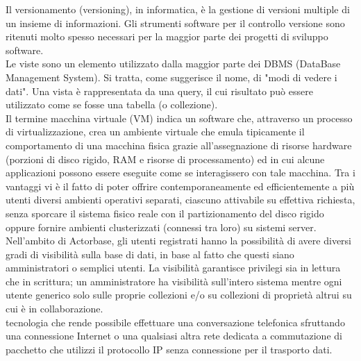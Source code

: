 \documentclass{scalatekids-article}
\begin{document}

   Il versionamento (versioning), in informatica, è la gestione di versioni multiple di un insieme di informazioni.
  Gli strumenti software per il controllo versione sono ritenuti molto spesso necessari per la maggior parte dei progetti di sviluppo software.
  \\
  
   Le viste sono un elemento utilizzato dalla maggior parte dei DBMS (DataBase Management System). Si tratta, come suggerisce il nome, di "modi di vedere i dati".
Una vista è rappresentata da una query, il cui risultato può essere utilizzato come se fosse una tabella (o collezione).
  \\

   Il termine macchina virtuale (VM) indica un software che, attraverso un processo di virtualizzazione, crea un ambiente virtuale che emula tipicamente il comportamento di una macchina fisica grazie all'assegnazione di risorse hardware (porzioni di disco rigido, RAM e risorse di processamento) ed in cui alcune applicazioni possono essere eseguite come se interagissero con tale macchina.
  Tra i vantaggi vi è il fatto di poter offrire contemporaneamente ed efficientemente a più utenti diversi ambienti operativi separati, ciascuno attivabile su effettiva richiesta, senza sporcare il sistema fisico reale con il partizionamento del disco rigido oppure fornire ambienti clusterizzati (connessi tra loro) su sistemi server.
  \\

   Nell'ambito di Actorbase, gli utenti registrati hanno la possibilità di avere diversi gradi di visibilità sulla base di dati, in base al fatto che questi siano amministratori o semplici utenti.
  La visibilità garantisce privilegi sia in lettura che in scrittura; un amministratore ha visibilità sull'intero sistema mentre ogni utente generico solo sulle proprie collezioni e/o su collezioni di proprietà altrui su cui è in collaborazione.
  \\

   tecnologia che rende possibile effettuare una conversazione telefonica sfruttando una connessione Internet o una qualsiasi altra rete dedicata a commutazione di pacchetto che utilizzi il protocollo IP senza connessione per il trasporto dati.
  \\

\end{document}
